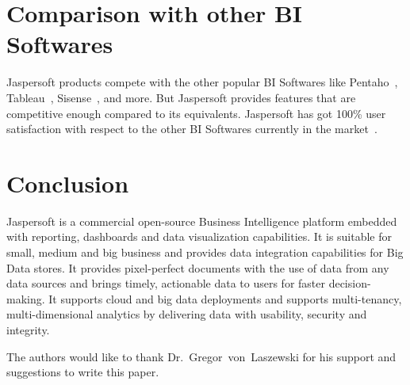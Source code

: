 \section{Comparison with other BI Softwares}
Jaspersoft products compete with the other popular BI Softwares like
Pentaho~\cite{hid-sp18-516-www-pentaho},
Tableau~\cite{hid-sp18-516-www-tableau},
Sisense~\cite{hid-sp18-516-www-sisense}, and more. But Jaspersoft provides
features that are competitive enough compared to its equivalents. Jaspersoft has
got 100\% user satisfaction with respect to the other BI Softwares currently in
the market~\cite{hid-sp18-516-www-finances-online-comparisons}. 


\section{Conclusion}
Jaspersoft is a commercial open-source Business Intelligence platform embedded
with reporting, dashboards and data visualization capabilities. It is suitable
for small, medium and big business and provides data integration capabilities
for Big Data stores. It provides pixel-perfect documents with the use of data
from any data sources and brings timely, actionable data to users for faster
decision-making. It supports cloud and big data deployments and supports
multi-tenancy, multi-dimensional analytics by delivering data with usability,
security and integrity. 

\begin{acks}

  The authors would like to thank Dr.~Gregor~von~Laszewski for his
  support and suggestions to write this paper.

\end{acks}


 

